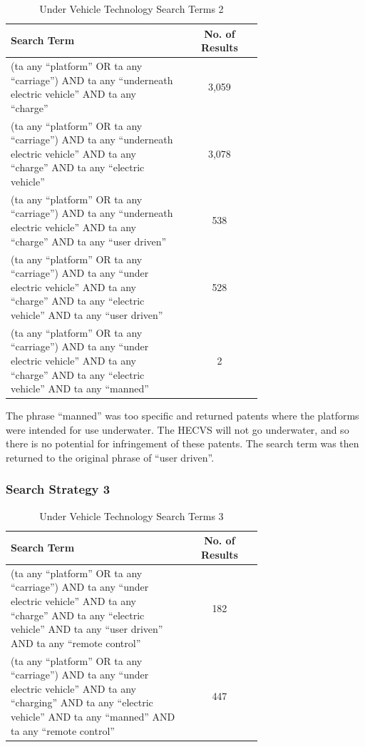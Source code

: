 \documentclass [12pt]{article}
\begin{document}
\begin{table}[H]
    \centering
    \setlength{\arrayrulewidth}{1.5pt}
    \begin{tabular}{|p{0.7\linewidth}|c|}
    \hline
    \cellcolor{gray!40}Search Term & \cellcolor{gray!40}No. of Results \\
    \hline
    (ta any “platform” OR ta any “carriage”) AND ta any “underneath electric vehicle” AND ta any “charge” & 3,059 \\
    \hline
    (ta any “platform” OR ta any “carriage”) AND ta any “underneath electric vehicle” AND ta any “charge” AND ta any “electric vehicle” & 3,078 \\
    \hline
    (ta any “platform” OR ta any “carriage”) AND ta any “underneath electric vehicle” AND ta any “charge” AND ta any “user driven” & 538 \\
    \hline
    (ta any “platform” OR ta any “carriage”) AND ta any “under electric vehicle” AND ta any “charge” AND ta any “electric vehicle” AND ta any “user driven” & 528 \\
    \hline
    (ta any “platform” OR ta any “carriage”) AND ta any “under electric vehicle” AND ta any “charge” AND ta any “electric vehicle” AND ta any “manned” & 2 \\
    \hline
    \end{tabular}
    \caption{Under Vehicle Technology Search Terms 2}
    \label{table:under_vehicle__search_strat_2}
\end{table}

The phrase “manned” was too specific and returned patents where the platforms were intended for use underwater. The HECVS will not go underwater, and so there is no potential for infringement of these patents. The search term was then returned to the original phrase of “user driven”.

\subsubsection{Search Strategy 3}

\begin{table}[H]
    \centering
    \setlength{\arrayrulewidth}{1.5pt}
    \begin{tabular}{|p{0.7\linewidth}|c|}
    \hline
    \cellcolor{gray!40}Search Term & \cellcolor{gray!40}No. of Results \\
    \hline
    (ta any “platform” OR ta any “carriage”) AND ta any “under electric vehicle” AND ta any “charge” AND ta any “electric vehicle” AND ta any “user driven” AND ta any “remote control” & 182 \\
    \hline
    (ta any “platform” OR ta any “carriage”) AND ta any “under electric vehicle” AND ta any “charging” AND ta any “electric vehicle” AND ta any “manned” AND ta any “remote control” & 447 \\
    \hline
    \end{tabular}
    \caption{Under Vehicle Technology Search Terms 3}
    \label{table:under_vehicle_search_strat_3}
\end{table}
\end{document}
